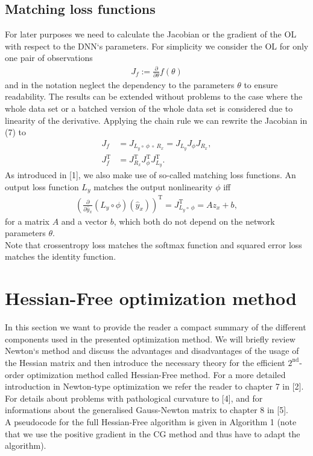 \documentclass[conference]{IEEEtran}
\begin{document}
	\subsection{Matching loss functions}
	\noindent
	For later purposes we need to calculate the Jacobian or the gradient of the OL with respect to the DNN`s parameters. For simplicity we consider the OL for only one pair of observations
	\begin{align}
	J_{f} := \frac{\partial}{\partial\theta}f(\theta)
	\end{align}
	and in the notation neglect the dependency to the parameters $\theta$ to ensure readability.
	The results can be extended without problems to the case where the whole data set or a batched version of the whole data set is considered due to linearity of the derivative.
	Applying the chain rule we can rewrite the Jacobian in (7) to
	\begin{align}
	J_{f} &= J_{L_{y}\circ \:\phi \:\circ\:R_{x}} = J_{L_{y}} J_{\phi} J_{R_{x}},\\
	J_{f}^{\mathrm{T}} &= J_{R_{x}}^{\mathrm{T}}  J_{\phi}^{\mathrm{T}}  J_{L_{y}}^{\mathrm{T}}.
	\end{align}
	As introduced in [1], we also make use of so-called matching loss functions. An output loss function $L_{y}$ matches the output nonlinearity $\phi$ iff
	\begin{align}
	\left(\frac{\partial}{\partial\hat{y}_{x}}\left(L_{y}\circ \phi\right)(\hat{y}_{x})\right)^{\mathrm{T}}= J_{L_{y}\circ \:\phi}^{\mathrm{T}} = A z_{x} + b,
	\end{align}
	for a matrix $A$ and a vector $b$, which both do not depend on the network parameters $\theta$.\\
	Note that crossentropy loss matches the softmax function and squared error loss matches the identity function.
	
	
	\section{Hessian-Free optimization method}
	\noindent
	In this section we want to provide the reader a compact summary of the different components used in the presented optimization method. We will briefly review Newton`s method and discuss the advantages and disadvantages of the usage of the Hessian matrix and then introduce the necessary theory for the efficient $2^{\text{nd}}$-order optimization method called Hessian-Free method. For a more detailed introduction in Newton-type optimization we refer the reader to chapter 7 in [2]. For details about problems with pathological curvature to [4], and for informations about the generalised Gauss-Newton matrix to chapter 8 in [5].\\
	A pseudocode for the full Hessian-Free algorithm is given in Algorithm 1 (note that we use the positive gradient in the CG method and thus have to adapt the algorithm).
	
\end{document}
